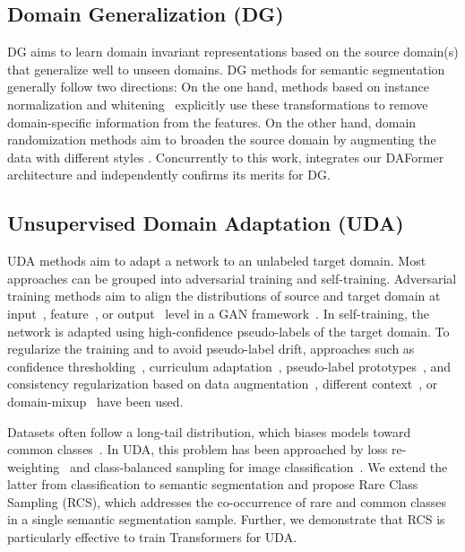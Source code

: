 \documentclass[journal,compsoc]{IEEEtran}
\begin{document}
\subsection{Domain Generalization (DG)}
\label{sec:related_work_domain_generalization}

DG aims to learn domain invariant representations based on the source domain(s) that generalize well to unseen  domains. DG methods for semantic segmentation generally follow two directions: On the one hand, methods based on instance normalization and whitening~\cite{pan2018two, choi2021robustnet} explicitly use these transformations to remove domain-specific information from the features. On the other hand, domain randomization methods aim to broaden the source domain by augmenting the data with different styles \cite{yue2019domain, peng2021global, zhao2022style, zhongadversarial, zhao2022stylea}.
Concurrently to this work, \cite{zhao2022stylea} integrates our DAFormer architecture and independently confirms its merits for DG.

\subsection{Unsupervised Domain Adaptation (UDA)}
\label{sec:related_work_uda}

UDA methods aim to adapt a network to an unlabeled target domain. Most approaches can be grouped into adversarial training and self-training. Adversarial training methods aim to align the distributions of source and target domain at input~\cite{hoffman2018cycada, gong2021dlow}, feature~\cite{hoffman2016fcns, tsai2018learning}, or output~\cite{tsai2018learning, vu2019advent} level in a GAN framework~\cite{goodfellow2014generative}.
In self-training, the network is adapted using high-confidence pseudo-labels of the target domain. To regularize the training and to avoid pseudo-label drift, approaches such as confidence thresholding~\cite{zou2018unsupervised}, curriculum adaptation~\cite{dai2020curriculum,dai2018dark}, pseudo-label prototypes~\cite{zhang2021prototypical}, and consistency regularization based on data augmentation~\cite{araslanov2021self,hoyer2022mic}, different context~\cite{zhou2021context}, or domain-mixup~\cite{tranheden2021dacs, hoyer2021improving} have been used.

Datasets often follow a long-tail distribution, which biases models toward common classes~\cite{wang2017learning}. In UDA, this problem has been approached by loss re-weighting~\cite{zou2018unsupervised} and class-balanced sampling for image classification~\cite{prabhu2021sentry}. We extend the latter from classification to semantic segmentation and propose Rare Class Sampling (RCS), which addresses the co-occurrence of rare and common classes in a single semantic segmentation sample. Further, we demonstrate that RCS is particularly effective to train Transformers for UDA.
\end{document}
